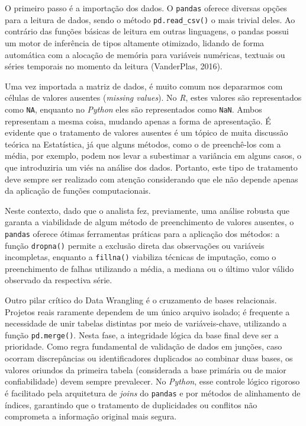 \documentclass[
  brazilian,
  letterpaper,
  DIV=11,
  numbers=noendperiod]{scrreprt}
\begin{document}
O primeiro passo é a importação dos dados. O \texttt{pandas} oferece
diversas opções para a leitura de dados, sendo o método
\texttt{pd.read\_csv()} o mais trivial deles. Ao contrário das funções
básicas de leitura em outras linguagens, o pandas possui um motor de
inferência de tipos altamente otimizado, lidando de forma automática com
a alocação de memória para variáveis numéricas, textuais ou séries
temporais no momento da leitura (VanderPlas, 2016).

Uma vez importada a matriz de dados, é muito comum nos depararmos com
células de valores ausentes (\emph{missing values}). No \emph{R}, estes
valores são representados como \texttt{NA}, enquanto no \emph{Python}
eles são representados como \texttt{NaN}. Ambos representam a mesma
coisa, mudando apenas a forma de apresentação. É evidente que o
tratamento de valores ausentes é um tópico de muita discussão teórica na
Estatística, já que alguns métodos, como o de preenchê-los com a média,
por exemplo, podem nos levar a subestimar a variância em alguns casos, o
que introduziria um viés na análise dos dados. Portanto, este tipo de
tratamento deve sempre ser realizado com atenção considerando que ele
não depende apenas da aplicação de funções computacionais.

Neste contexto, dado que o analista fez, previamente, uma análise
robusta que garanta a viabilidade de algum método de preenchimento de
valores ausentes, o \texttt{pandas} oferece ótimas ferramentas práticas
para a aplicação dos métodos: a função \texttt{dropna()} permite a
exclusão direta das observações ou variáveis incompletas, enquanto a
\texttt{fillna()} viabiliza técnicas de imputação, como o preenchimento
de falhas utilizando a média, a mediana ou o último valor válido
observado da respectiva série.

Outro pilar crítico do Data Wrangling é o cruzamento de bases
relacionais. Projetos reais raramente dependem de um único arquivo
isolado; é frequente a necessidade de unir tabelas distintas por meio de
variáveis-chave, utilizando a função \texttt{pd.merge()}. Nesta fase, a
integridade lógica da base final deve ser a prioridade. Como regra
fundamental de validação de dados em junções, caso ocorram discrepâncias
ou identificadores duplicados ao combinar duas bases, os valores
oriundos da primeira tabela (considerada a base primária ou de maior
confiabilidade) devem sempre prevalecer. No \emph{Python}, esse controle
lógico rigoroso é facilitado pela arquitetura de \emph{joins} do
\texttt{pandas} e por métodos de alinhamento de índices, garantindo que
o tratamento de duplicidades ou conflitos não comprometa a informação
original mais segura.
\end{document}
